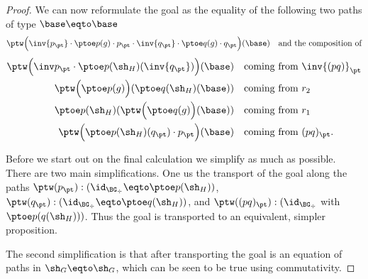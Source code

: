 \begin{proof}
We can now reformulate the goal as %
the equality of the following two paths of 
type $\base\eqto\base$  %
\[
\ptw\Bigl(\inv{p_\pt} \cdot \ptoe p(g) \cdot p_\pt \cdot
\inv{q_\pt} \cdot \ptoe q(g) \cdot q_\pt\Bigr)(\base) 
\quad\text{and the composition of}
\]
\begin{align*}
\ptw\Bigl(\inv p_\pt \cdot \ptoe p(\sh_H)(\inv{q_\pt})\Bigr)(\base)
&\quad\text{coming from $\inv{(pq)}_\pt$} \\
\ptw\Bigl(\ptoe p(g)\Bigr)(\ptoe q(\sh_H)(\base))
&\quad\text{coming from $r_2$} \\
\ptoe p(\sh_H)(\ptw\Bigl(\ptoe q(g)\Bigr)(\base))
&\quad\text{coming from $r_1$} \\
\ptw\Bigl(\ptoe p(\sh_H)(q_\pt)\cdot p_\pt\Bigr)(\base) 
&\quad\text{coming from $(pq)_\pt$.}
\end{align*}



Before we start out on the final calculation we simplify as
much as possible. There are two main simplifications.
One us the transport of the goal along the paths
$\ptw(p_\pt): (\id_{\BG_\div}\eqto\ptoe p(\sh_H))$,
$\ptw(q_\pt): (\id_{\BG_\div}\eqto\ptoe q(\sh_H))$, and
$\ptw((pq)_\pt): (\id_{\BG_\div}$ with $\ptoe p(q(\sh_H)))$.
Thus the goal is transported to an equivalent, simpler proposition.

The second simplification is that after transporting the
goal is an equation of paths in $\sh_G\eqto\sh_G$, which
can be seen to be true using commutativity. 




\end{proof}

